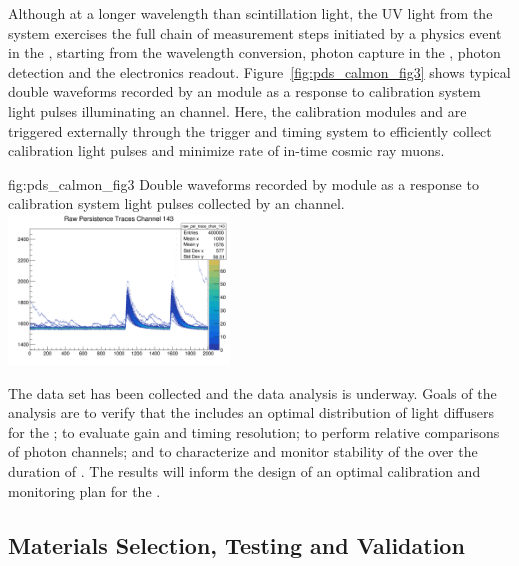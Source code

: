 Although at a longer wavelength than \lar scintillation light, the UV light from the system exercises the full chain of measurement steps initiated by a physics event in the , starting from the wavelength %
conversion, photon capture in the , photon %
detection and the  electronics readout.
Figure~\ref{fig:pds_calmon_fig3} shows typical double waveforms recorded by an   module as a response to calibration system
light pulses illuminating %
an  channel. Here, the calibration modules and  are triggered externally through the trigger and timing system to efficiently collect calibration light pulses  and minimize rate of in-time cosmic ray muons.

 \begin{dunefigure}
 {fig:pds_calmon_fig3}
 {Double waveforms recorded by   module as a response to calibration system light pulses collected by an  channel.}
\includegraphics[height=4cm]{graphics/pds-calmon-example.png}
\end{dunefigure}

The  data set has been collected and the data analysis is underway.
Goals of the analysis are to verify that the  includes %
an optimal distribution of light diffusers for the ;  %
to evaluate gain and timing resolution; to perform relative comparisons of photon channels;
and to characterize and monitor stability of the  over the duration of . The results will inform the design of an optimal
 calibration and monitoring plan for the .%

\subsection{Materials Selection, Testing and Validation}

